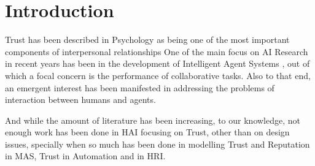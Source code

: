 \section{Introduction}
\label{sec:Introduction}

Trust has been described in Psychology as being one of the most important components of interpersonal relationships \cite{Simpson2007a}
One of the main focus on \ac{AI} Research in recent years has been in the development of Intelligent Agent Systems \cite{Russell2009a}, out of which a focal concern is the performance of collaborative tasks\cite{Grosz1996, Allen2002, Allen2007}. Also to that end, an emergent interest has been manifested in addressing the problems of interaction between humans and agents\cite{Bradshaw2011}.

And while the amount of literature has been increasing, to our knowledge, not enough work has been done in \ac{HAI} focusing on Trust, other than on design issues\cite{Bickmore2005}, specially when so much has been done in modelling Trust and Reputation in \ac{MAS}\cite{Granatyr2015}, Trust in Automation \cite{Lee1992, Jones1997, Lee2004} and in \ac{HRI}\cite{Goodrich2007, VandenBrule2014}.

